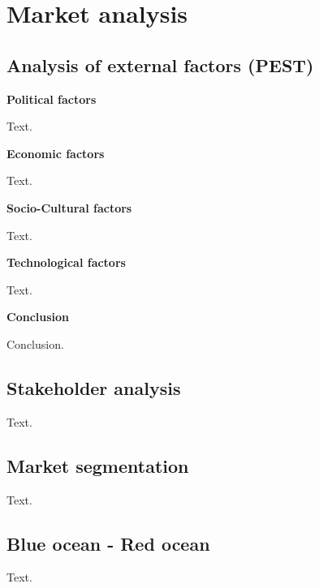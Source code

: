 \documentclass[12p]{article}
\begin{document}
\newpage
\section{Market analysis} \label{MarketAnalysis}


\subsection{Analysis of external factors (PEST)} \label{PEST}

\textbf{Political factors}

Text. \medskip

\textbf{Economic factors}

Text. \medskip

\textbf{Socio-Cultural factors}

Text. \medskip

\textbf{Technological factors}

Text. \medskip

\textbf{Conclusion}

Conclusion.

\newpage


\subsection{Stakeholder analysis} \label{Stakeholder_Analysis}

Text.

\newpage


\subsection{Market segmentation} \label{MarketSegmentation}

Text.

\newpage


\subsection{Blue ocean - Red ocean} \label{BlueOceanRedOcean}

Text.

\newpage
\end{document}
